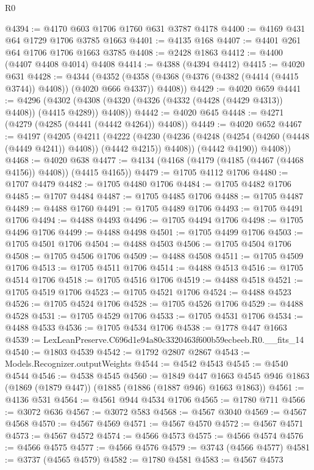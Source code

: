 \begin{lexlean}{R0}
\begin{coremodule}
@4394 := @4170 @603 @1706 @1760 @631 @3787 @4178
@4400 := @4169 @431 @64 @1729 @1706 @3785 @1663
@4401 := @4135 @168
@4407 := @4401 @261 @64 @1706 @1706 @1663 @3785
@4408 := @2428 @1863
@4412 := @4400 (@4407 @4408 @4014) @4408
@4414 := @4388 (@4394 @4412)
@4415 := @4020 @631
@4428 := @4344
    (@4352 (@4358 (@4368 (@4376 (@4382 (@4414 (@4415 @3744)) @4408)) (@4020 @666 @4337)) @4408))
@4429 := @4020 @659
@4441 := @4296
    (@4302 (@4308 (@4320 (@4326 (@4332 (@4428 (@4429 @4313)) @4408)) (@4415 @4289)) @4408))
@4442 := @4020 @645
@4448 := @4271 (@4279 (@4285 (@4441 (@4442 @4264)) @4408))
@4449 := @4020 @652
@4467 := @4197
    (@4205
      (@4211
        (@4222
          (@4230 (@4236 (@4248 (@4254 (@4260 (@4448 (@4449 @4241)) @4408)) (@4442 @4215)) @4408))
          (@4442 @4190))
        @4408))
@4468 := @4020 @638
@4477 := @4134 (@4168 (@4179 (@4185 (@4467 (@4468 @4156)) @4408)) (@4415 @4165))
@4479 := @1705 @4112 @1706
@4480 := @1707 @4479
@4482 := @1705 @4480 @1706
@4484 := @1705 @4482 @1706
@4485 := @1707 @4484
@4487 := @1705 @4485 @1706
@4488 := @1705 @4487
@4489 := @4488 @1760
@4491 := @1705 @4489 @1706
@4493 := @1705 @4491 @1706
@4494 := @4488 @4493
@4496 := @1705 @4494 @1706
@4498 := @1705 @4496 @1706
@4499 := @4488 @4498
@4501 := @1705 @4499 @1706
@4503 := @1705 @4501 @1706
@4504 := @4488 @4503
@4506 := @1705 @4504 @1706
@4508 := @1705 @4506 @1706
@4509 := @4488 @4508
@4511 := @1705 @4509 @1706
@4513 := @1705 @4511 @1706
@4514 := @4488 @4513
@4516 := @1705 @4514 @1706
@4518 := @1705 @4516 @1706
@4519 := @4488 @4518
@4521 := @1705 @4519 @1706
@4523 := @1705 @4521 @1706
@4524 := @4488 @4523
@4526 := @1705 @4524 @1706
@4528 := @1705 @4526 @1706
@4529 := @4488 @4528
@4531 := @1705 @4529 @1706
@4533 := @1705 @4531 @1706
@4534 := @4488 @4533
@4536 := @1705 @4534 @1706
@4538 := @1778 @447 @1663
@4539 := LexLeanPreserve.C696d1e94a80c3320463f600b59ecbeeb.R0.__fits_14
@4540 := @1803 @4539
@4542 := @1792 @2807 @2867
@4543 := Models.Recognizer.outputWeights
@4544 := @4542 @4543
@4545 := @4540 @4544
@4546 := @4538 @4545
@4560 := @1849
    @447
    @1663
    @4545
    @946
    @1863
    (@1869 (@1879 @447))
    (@1885 (@1886 (@1887 @946) @1663 @1863))
@4561 := @4136 @531
@4564 := @4561 @944 @4534 @1706
@4565 := @1780 @711
@4566 := @3072 @636
@4567 := @3072 @583
@4568 := @4567 @3040
@4569 := @4567 @4568
@4570 := @4567 @4569
@4571 := @4567 @4570
@4572 := @4567 @4571
@4573 := @4567 @4572
@4574 := @4566 @4573
@4575 := @4566 @4574
@4576 := @4566 @4575
@4577 := @4566 @4576
@4579 := @3743 (@4566 @4577)
@4581 := @3737 (@4565 @4579)
@4582 := @1780 @4581
@4583 := @4567 @4573

\end{coremodule}
\end{lexlean}
